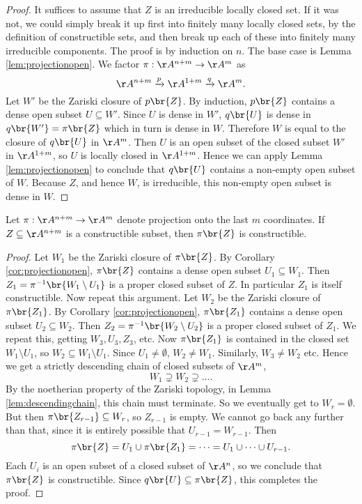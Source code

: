 \begin{proof}
It suffices to assume that $ Z $ is an irreducible locally closed set. If it was not, we could simply break it up first into finitely many locally closed sets, by the definition of constructible sets, and then break up each of these into finitely many irreducible components. The proof is by induction on $ n $. The base case is Lemma \ref{lem:projectionopen}. We factor $ \pi : \AA^{n + m} \to \AA^m $ as
$$ \AA^{n + m} \xrightarrow{p} \AA^{1 + m} \xrightarrow{q} \AA^m. $$
Let $ W' $ be the Zariski closure of $ p\br{Z} $. By induction, $ p\br{Z} $ contains a dense open subset $ U \subseteq W' $. Since $ U $ is dense in $ W' $, $ q\br{U} $ is dense in $ q\br{W'} = \pi\br{Z} $ which in turn is dense in $ W $. Therefore $ W $ is equal to the closure of $ q\br{U} $ in $ \AA^m $. Then $ U $ is an open subset of the closed subset $ W' $ in $ \AA^{1 + m} $, so $ U $ is locally closed in $ \AA^{1 + m} $. Hence we can apply Lemma \ref{lem:projectionopen} to conclude that $ q\br{U} $ contains a non-empty open subset of $ W $. Because $ Z $, and hence $ W $, is irreducible, this non-empty open subset is dense in $ W $.
\end{proof}

\begin{lemma}
\label{lem:projectionconstructible}
Let $ \pi : \AA^{n + m} \to \AA^m $ denote projection onto the last $ m $ coordinates. If $ Z \subseteq \AA^{n + m} $ is a constructible subset, then $ \pi\br{Z} $ is constructible.
\end{lemma}

\begin{proof}
Let $ W_1 $ be the Zariski closure of $ \pi\br{Z} $. By Corollary \ref{cor:projectionopen}, $ \pi\br{Z} $ contains a dense open subset $ U_1 \subseteq W_1 $. Then $ Z_1 = \pi^{-1}\br{W_1 \setminus U_1} $ is a proper closed subset of $ Z $. In particular $ Z_1 $ is itself constructible. Now repeat this argument. Let $ W_2 $ be the Zariski closure of $ \pi\br{Z_1} $. By Corollary \ref{cor:projectionopen}, $ \pi\br{Z_1} $ contains a dense open subset $ U_2 \subseteq W_2 $. Then $ Z_2 = \pi^{-1}\br{W_2 \setminus U_2} $ is a proper closed subset of $ Z_1 $. We repeat this, getting $ W_3, U_3, Z_3 $, etc. Now $ \pi\br{Z_1} $ is contained in the closed set $ W_1 \setminus U_1 $, so $ W_2 \subseteq W_1 \setminus U_1 $. Since $ U_1 \ne \emptyset $, $ W_2 \ne W_1 $. Similarly, $ W_3 \ne W_2 $ etc. Hence we get a strictly descending chain of closed subsets of $ \AA^m $,
$$ W_1 \supsetneq W_2 \supsetneq \dots. $$
By the noetherian property of the Zariski topology, in Lemma \ref{lem:descendingchain}, this chain must terminate. So we eventually get to $ W_r = \emptyset $. But then $ \pi\br{Z_{r - 1}} \subseteq W_r $, so $ Z_{r - 1} $ is empty. We cannot go back any further than that, since it is entirely possible that $ U_{r - 1} = W_{r - 1} $. Then
$$ \pi\br{Z} = U_1 \cup \pi\br{Z_1} = \dots = U_1 \cup \dots \cup U_{r - 1}. $$
Each $ U_i $ is an open subset of a closed subset of $ \AA^n $, so we conclude that $ \pi\br{Z} $ is constructible. Since $ q\br{U} \subseteq \pi\br{Z} $, this completes the proof.
\end{proof}

